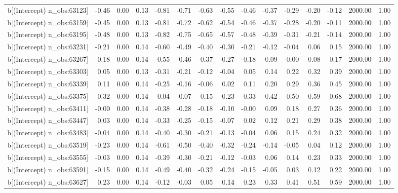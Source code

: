 \begin{table}[ht]
\begin{tabular}{rrrrrrrrrrrrrrr}
  b[(Intercept) n\_obs:63123] & -0.46 & 0.00 & 0.13 & -0.81 & -0.71 & -0.63 & -0.55 & -0.46 & -0.37 & -0.29 & -0.20 & -0.12 & 2000.00 & 1.00 \\ 
  b[(Intercept) n\_obs:63159] & -0.45 & 0.00 & 0.13 & -0.81 & -0.72 & -0.62 & -0.54 & -0.46 & -0.37 & -0.28 & -0.20 & -0.11 & 2000.00 & 1.00 \\ 
  b[(Intercept) n\_obs:63195] & -0.48 & 0.00 & 0.13 & -0.82 & -0.75 & -0.65 & -0.57 & -0.48 & -0.39 & -0.31 & -0.21 & -0.14 & 2000.00 & 1.00 \\ 
  b[(Intercept) n\_obs:63231] & -0.21 & 0.00 & 0.14 & -0.60 & -0.49 & -0.40 & -0.30 & -0.21 & -0.12 & -0.04 & 0.06 & 0.15 & 2000.00 & 1.00 \\ 
  b[(Intercept) n\_obs:63267] & -0.18 & 0.00 & 0.14 & -0.55 & -0.46 & -0.37 & -0.27 & -0.18 & -0.09 & -0.00 & 0.08 & 0.17 & 2000.00 & 1.00 \\ 
  b[(Intercept) n\_obs:63303] & 0.05 & 0.00 & 0.13 & -0.31 & -0.21 & -0.12 & -0.04 & 0.05 & 0.14 & 0.22 & 0.32 & 0.39 & 2000.00 & 1.00 \\ 
  b[(Intercept) n\_obs:63339] & 0.11 & 0.00 & 0.14 & -0.25 & -0.16 & -0.06 & 0.02 & 0.11 & 0.20 & 0.29 & 0.36 & 0.45 & 2000.00 & 1.00 \\ 
  b[(Intercept) n\_obs:63375] & 0.32 & 0.00 & 0.14 & -0.04 & 0.07 & 0.15 & 0.23 & 0.33 & 0.42 & 0.50 & 0.59 & 0.68 & 2000.00 & 1.00 \\ 
  b[(Intercept) n\_obs:63411] & -0.00 & 0.00 & 0.14 & -0.38 & -0.28 & -0.18 & -0.10 & -0.00 & 0.09 & 0.18 & 0.27 & 0.36 & 2000.00 & 1.00 \\ 
  b[(Intercept) n\_obs:63447] & 0.03 & 0.00 & 0.14 & -0.33 & -0.25 & -0.15 & -0.07 & 0.02 & 0.12 & 0.21 & 0.29 & 0.38 & 2000.00 & 1.00 \\ 
  b[(Intercept) n\_obs:63483] & -0.04 & 0.00 & 0.14 & -0.40 & -0.30 & -0.21 & -0.13 & -0.04 & 0.06 & 0.15 & 0.24 & 0.32 & 2000.00 & 1.00 \\ 
  b[(Intercept) n\_obs:63519] & -0.23 & 0.00 & 0.14 & -0.61 & -0.50 & -0.40 & -0.32 & -0.24 & -0.14 & -0.05 & 0.04 & 0.12 & 2000.00 & 1.00 \\ 
  b[(Intercept) n\_obs:63555] & -0.03 & 0.00 & 0.14 & -0.39 & -0.30 & -0.21 & -0.12 & -0.03 & 0.06 & 0.14 & 0.23 & 0.33 & 2000.00 & 1.00 \\ 
  b[(Intercept) n\_obs:63591] & -0.15 & 0.00 & 0.14 & -0.49 & -0.40 & -0.32 & -0.24 & -0.15 & -0.05 & 0.03 & 0.12 & 0.22 & 2000.00 & 1.00 \\ 
  b[(Intercept) n\_obs:63627] & 0.23 & 0.00 & 0.14 & -0.12 & -0.03 & 0.05 & 0.14 & 0.23 & 0.33 & 0.41 & 0.51 & 0.59 & 2000.00 & 1.00 \\ 

\end{tabular}
\end{table}
